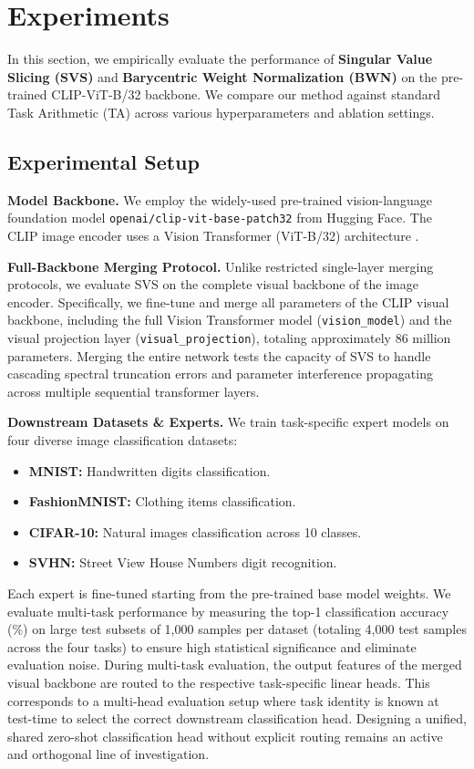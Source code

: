 \section{Experiments}
\label{sec:experiments}

In this section, we empirically evaluate the performance of \textbf{Singular Value Slicing (SVS)} and \textbf{Barycentric Weight Normalization (BWN)} on the pre-trained CLIP-ViT-B/32 backbone. We compare our method against standard Task Arithmetic (TA) across various hyperparameters and ablation settings.

\subsection{Experimental Setup}

\textbf{Model Backbone.} We employ the widely-used pre-trained vision-language foundation model \texttt{openai/clip-vit-base-patch32} \cite{radford2021learning} from Hugging Face. The CLIP image encoder uses a Vision Transformer (ViT-B/32) architecture \cite{dosovitskiy2020image}.

\textbf{Full-Backbone Merging Protocol.} Unlike restricted single-layer merging protocols, we evaluate SVS on the complete visual backbone of the image encoder. Specifically, we fine-tune and merge all parameters of the CLIP visual backbone, including the full Vision Transformer model (\texttt{vision\_model}) and the visual projection layer (\texttt{visual\_projection}), totaling approximately 86 million parameters. Merging the entire network tests the capacity of SVS to handle cascading spectral truncation errors and parameter interference propagating across multiple sequential transformer layers.

\textbf{Downstream Datasets \& Experts.} We train task-specific expert models on four diverse image classification datasets:
\begin{itemize}
    \item \textbf{MNIST:} Handwritten digits classification.
    \item \textbf{FashionMNIST:} Clothing items classification.
    \item \textbf{CIFAR-10:} Natural images classification across 10 classes.
    \item \textbf{SVHN:} Street View House Numbers digit recognition.
\end{itemize}
Each expert is fine-tuned starting from the pre-trained base model weights. We evaluate multi-task performance by measuring the top-1 classification accuracy (\%) on large test subsets of 1,000 samples per dataset (totaling 4,000 test samples across the four tasks) to ensure high statistical significance and eliminate evaluation noise. During multi-task evaluation, the output features of the merged visual backbone are routed to the respective task-specific linear heads. This corresponds to a multi-head evaluation setup where task identity is known at test-time to select the correct downstream classification head. Designing a unified, shared zero-shot classification head without explicit routing remains an active and orthogonal line of investigation.

